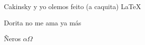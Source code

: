 \documentclass{article}
\begin{document}
   Cakinsky y yo olemos feito (a caquita) 
   \LaTeX    
  
    Dorita no me ama ya más

   Ñeros
   $\alpha \Omega$
\end{document}
